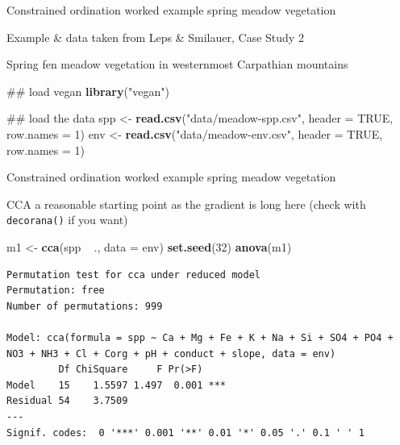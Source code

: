 \documentclass[10pt,ignorenonframetext,compress, aspectratio=169]{beamer}
\newenvironment{Shaded}{\begin{snugshade}}{\end{snugshade}}
\newcommand{\KeywordTok}[1]{\textcolor[rgb]{0.13,0.29,0.53}{\textbf{{#1}}}}
\newcommand{\DataTypeTok}[1]{\textcolor[rgb]{0.13,0.29,0.53}{{#1}}}
\newcommand{\DecValTok}[1]{\textcolor[rgb]{0.00,0.00,0.81}{{#1}}}
\newcommand{\StringTok}[1]{\textcolor[rgb]{0.31,0.60,0.02}{{#1}}}
\newcommand{\OtherTok}[1]{\textcolor[rgb]{0.56,0.35,0.01}{{#1}}}
\newcommand{\NormalTok}[1]{{#1}}
\begin{document}
\begin{frame}[fragile]{Constrained ordination worked example \textbar{}
spring meadow vegetation}

Example \& data taken from Leps \& Smilauer, Case Study 2

Spring fen meadow vegetation in westernmost Carpathian mountains

\scriptsize

\begin{Shaded}
\begin{Highlighting}[]
\NormalTok{## load vegan}
\KeywordTok{library}\NormalTok{(}\StringTok{"vegan"}\NormalTok{)}

\NormalTok{## load the data}
\NormalTok{spp <-}\StringTok{ }\KeywordTok{read.csv}\NormalTok{(}\StringTok{"data/meadow-spp.csv"}\NormalTok{, }\DataTypeTok{header =} \OtherTok{TRUE}\NormalTok{, }\DataTypeTok{row.names =} \DecValTok{1}\NormalTok{)}
\NormalTok{env <-}\StringTok{ }\KeywordTok{read.csv}\NormalTok{(}\StringTok{"data/meadow-env.csv"}\NormalTok{, }\DataTypeTok{header =} \OtherTok{TRUE}\NormalTok{, }\DataTypeTok{row.names =} \DecValTok{1}\NormalTok{)}
\end{Highlighting}
\end{Shaded}

\normalsize

\end{frame}

\begin{frame}[fragile]{Constrained ordination worked example \textbar{}
spring meadow vegetation}

CCA a reasonable starting point as the gradient is long here (check with
\texttt{decorana()} if you want)

\scriptsize

\begin{Shaded}
\begin{Highlighting}[]
\NormalTok{m1 <-}\StringTok{ }\KeywordTok{cca}\NormalTok{(spp ~}\StringTok{ }\NormalTok{., }\DataTypeTok{data =} \NormalTok{env)}
\KeywordTok{set.seed}\NormalTok{(}\DecValTok{32}\NormalTok{)}
\KeywordTok{anova}\NormalTok{(m1)}
\end{Highlighting}
\end{Shaded}

\begin{verbatim}
Permutation test for cca under reduced model
Permutation: free
Number of permutations: 999

Model: cca(formula = spp ~ Ca + Mg + Fe + K + Na + Si + SO4 + PO4 + NO3 + NH3 + Cl + Corg + pH + conduct + slope, data = env)
         Df ChiSquare     F Pr(>F)    
Model    15    1.5597 1.497  0.001 ***
Residual 54    3.7509                 
---
Signif. codes:  0 '***' 0.001 '**' 0.01 '*' 0.05 '.' 0.1 ' ' 1
\end{verbatim}

\normalsize

\end{frame}
\end{document}

